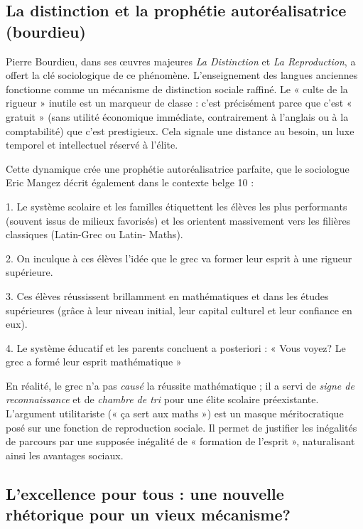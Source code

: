 \subsection{La distinction et la prophétie autoréalisatrice (bourdieu)}

Pierre Bourdieu, dans ses œuvres majeures \textit{La Distinction} et \textit{La Reproduction}, a
offert la clé sociologique de ce phénomène. L'enseignement des langues anciennes fonctionne comme un
mécanisme de distinction sociale raffiné. Le « culte de la rigueur » inutile est un marqueur de
classe : c'est précisément parce que c'est « gratuit » (sans utilité économique immédiate,
contrairement à l'anglais ou à la comptabilité) que c'est prestigieux. Cela signale une distance au
besoin, un luxe temporel et intellectuel réservé à l'élite.\cite{II-1-2-ref39}

Cette dynamique crée une prophétie autoréalisatrice parfaite, que le sociologue Eric Mangez décrit
également dans le contexte belge 10 :

1. Le système scolaire et les familles étiquettent les élèves les plus performants (souvent issus de
milieux favorisés) et les orientent massivement vers les filières classiques (Latin-Grec ou Latin-
Maths).

2. On inculque à ces élèves l'idée que le grec va former leur esprit à une rigueur supérieure.

3. Ces élèves réussissent brillamment en mathématiques et dans les études supérieures (grâce à leur
niveau initial, leur capital culturel et leur confiance en eux).

4. Le système éducatif et les parents concluent a posteriori : « Vous voyez? Le grec a formé leur
esprit mathématique\! »

En réalité, le grec n'a pas \textit{causé} la réussite mathématique ; il a servi de \textit{signe de
reconnaissance} et de \textit{chambre de tri} pour une élite scolaire préexistante. L'argument
utilitariste (« ça sert aux maths ») est un masque méritocratique posé sur une fonction de
reproduction sociale. Il permet de justifier les inégalités de parcours par une supposée inégalité
de « formation de l'esprit », naturalisant ainsi les avantages sociaux.



\subsection{L'excellence pour tous : une nouvelle rhétorique pour un vieux mécanisme?}

